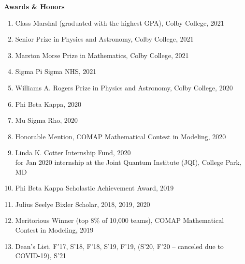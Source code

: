 \documentclass[10pt]{article}
\begin{document}
%
%
%





\noindent \large{\textbf{{Awards \& Honors }}}  \normalsize \vspace{-5pt} 
\begin{enumerate}
	\setlength\itemsep{-4pt}
	\item Class Marshal (graduated with the highest GPA), Colby College, {2021}
	\item Senior Prize in Physics and Astronomy, Colby College, {2021}
	\item Marston Morse Prize in Mathematics, Colby College, {2021}
	\item Sigma Pi Sigma NHS, {2021}
	\item {Williams A. Rogers Prize in Physics and Astronomy}, Colby College, {2020} 
	\item {Phi Beta Kappa}, {2020} 
	\item {Mu Sigma Rho}, {2020}
	\item {Honorable Mention,}  COMAP Mathematical Contest in Modeling, {2020}
	\item {Linda K. Cotter Internship Fund}, {2020}\\
	      for Jan 2020 internship at the Joint Quantum Institute (JQI), College Park, MD
	\item {Phi Beta Kappa Scholastic Achievement Award,} {2019}
	\item {Julius Seelye Bixler Scholar,} {2018, 2019, 2020}
	\item {Meritorious Winner (top 8\% of 10,000 teams),}  COMAP Mathematical Contest in Modeling, {2019}
	\item {Dean’s List}, {F'17, S'18, F'18, S'19, F'19, (S'20, F'20 -- canceled due to COVID-19), S'21}
\end{enumerate}
\end{document}
